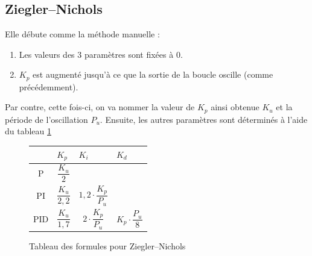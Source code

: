 \documentclass[a4paper,10pt]{report}
\begin{document}
\subsection{Ziegler–Nichols}

Elle débute comme la méthode manuelle :
\begin{enumerate}
    \item Les valeurs des 3 paramètres sont fixées à $0$.
    \item $K_p$ est augmenté jusqu'à ce que la sortie de la boucle oscille (comme précédemment).
\end{enumerate}

Par contre, cette fois-ci, on va nommer la valeur de $K_p$ ainsi obtenue $K_u$ et la période de l'oscillation $P_u$.
Ensuite, les autres paramètres sont déterminés à l'aide du tableau \ref{tab:ZieglerNicholsTuningFormulas}

\def\tabularxcolumn#1{m{#1}}
\begin{figure}[ht]
    \begin{center}
        \begin{tabularx}{\textwidth}{| c | X | X | X |}
            \hline
            & $K_p$ & $K_i$ & $K_d$\\ \hline
            P & \begin{equation*}\frac{K_u}{2}\end{equation*} & &\\ \hline
            PI & \begin{equation*}\frac{K_u}{2,2}\end{equation*} & \begin{equation*}1,2 \cdot \frac{K_p}{P_u}\end{equation*} &\\ \hline
            PID & \begin{equation*}\frac{K_u}{1,7}\end{equation*} & \begin{equation*}2 \cdot \frac{K_p}{P_u}\end{equation*} & \begin{equation*}K_p \cdot \frac{P_u}{8}\end{equation*} \\
            \hline
        \end{tabularx}
    \end{center}
    \caption{Tableau des formules pour Ziegler–Nichols}
    \label{tab:ZieglerNicholsTuningFormulas}
\end{figure}
\end{document}

